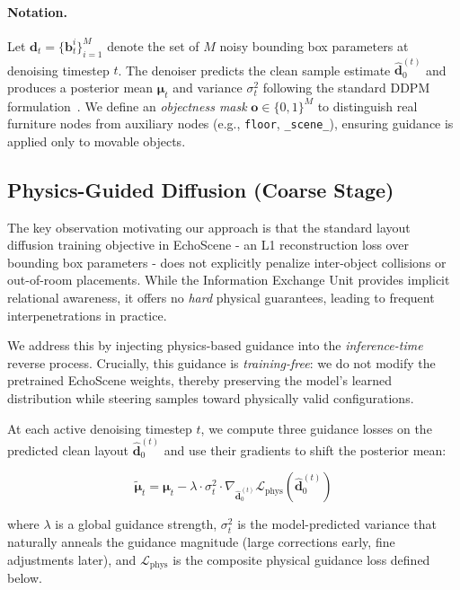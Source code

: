 \paragraph{Notation.}
Let $\mathbf{d}_t = \{\mathbf{b}_t^i\}_{i=1}^{M}$ denote the set of $M$ noisy bounding box parameters at denoising timestep $t$.
The denoiser predicts the clean sample estimate $\hat{\mathbf{d}}_0^{(t)}$ and produces a posterior mean $\boldsymbol{\mu}_t$ and variance $\sigma_t^2$ following the standard DDPM formulation~\cite{ho2020ddpm}.
We define an \emph{objectness mask} $\mathbf{o} \in \{0,1\}^M$ to distinguish real furniture nodes from auxiliary nodes (e.g., \texttt{floor}, \texttt{\_scene\_}), ensuring guidance is applied only to movable objects.

\subsection{Physics-Guided Diffusion (Coarse Stage)}
\label{sec:method:guidance}

The key observation motivating our approach is that the standard layout diffusion training objective in EchoScene - an L1 reconstruction loss over bounding box parameters - does not explicitly penalize inter-object collisions or out-of-room placements.
While the Information Exchange Unit provides implicit relational awareness, it offers no \emph{hard} physical guarantees, leading to frequent interpenetrations in practice.

We address this by injecting physics-based guidance into the \emph{inference-time} reverse process.
Crucially, this guidance is \emph{training-free}: we do not modify the pretrained EchoScene weights, thereby preserving the model's learned distribution while steering samples toward physically valid configurations.

At each active denoising timestep $t$, we compute three guidance losses on the predicted clean layout $\hat{\mathbf{d}}_0^{(t)}$ and use their gradients to shift the posterior mean:

\begin{equation}
\tilde{\boldsymbol{\mu}}_t = \boldsymbol{\mu}_t - \lambda \cdot \sigma_t^2 \cdot \nabla_{\hat{\mathbf{d}}_0^{(t)}} \mathcal{L}_{\mathrm{phys}}(\hat{\mathbf{d}}_0^{(t)})
\label{eq:guided_mean}
\end{equation}

\noindent where $\lambda$ is a global guidance strength, $\sigma_t^2$ is the model-predicted variance that naturally anneals the guidance magnitude (large corrections early, fine adjustments later), and $\mathcal{L}_{\mathrm{phys}}$ is the composite physical guidance loss defined below.


